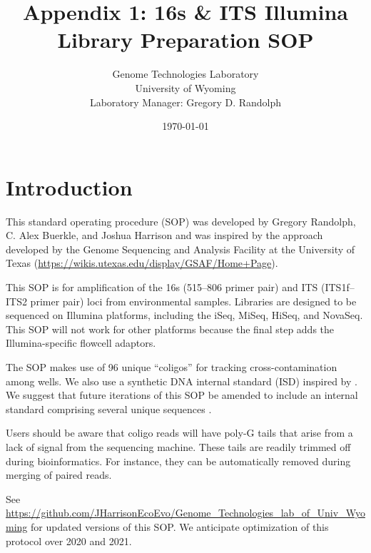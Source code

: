 \documentclass{article}
\title{Appendix 1: 16s \& ITS Illumina Library Preparation SOP}
\author{Genome Technologies Laboratory\\University of Wyoming\\
Laboratory Manager: Gregory D. Randolph}
\date{\today}
\begin{document}
\maketitle

\section{Introduction}

This standard operating procedure (SOP) was developed by Gregory Randolph, C. Alex Buerkle, and Joshua Harrison and was inspired by the approach developed by the Genome Sequencing and Analysis Facility at the University of Texas (\url{https://wikis.utexas.edu/display/GSAF/Home+Page}).

This SOP is for amplification of the 16s (515--806 primer pair) and ITS (ITS1f--ITS2 primer pair) loci from environmental samples. Libraries are designed to be sequenced on Illumina platforms, including the iSeq, MiSeq, HiSeq, and NovaSeq. This SOP will not work for other platforms because the final step adds the Illumina-specific flowcell adaptors.

The SOP makes use of 96 unique ``coligos'' for tracking cross-contamination among wells. We also use a synthetic DNA internal standard (ISD) inspired by \autocite{tourlousse_synthetic_2017}. We suggest that future iterations of this SOP be amended to include an internal standard comprising several unique sequences \autocite[see][]{harrison_quest_2020}.

Users should be aware that coligo reads will have poly-G tails that arise from a lack of signal from the sequencing machine. These tails are readily trimmed off during bioinformatics. For instance, they can be automatically removed during merging of paired reads.

See \url{https://github.com/JHarrisonEcoEvo/Genome_Technologies_lab_of_Univ_Wyoming} for updated versions of this SOP. We anticipate optimization of this protocol over 2020 and 2021.
\end{document}
